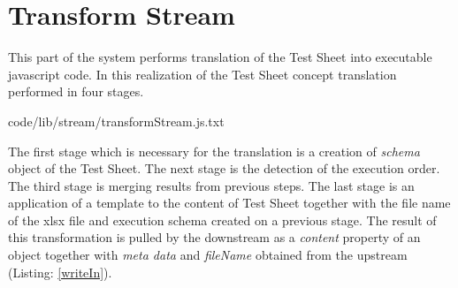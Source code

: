 %
%


\section{Transform Stream}
\label{sec:transform}
This part of the system performs translation of the Test Sheet into executable javascript code. In this realization of the Test Sheet concept translation performed in four stages. 



{code/lib/stream/transformStream.js.txt}

The first stage which is necessary for the translation is a creation of \textit{schema} object of the Test Sheet. The next stage is the detection of the execution order. The third stage is merging results from previous steps. The last stage is an application of a template to the content of Test Sheet together with the file name of the xlsx file and execution schema created on a previous stage. The result of this transformation is pulled by the downstream as a \textit{content} property of an object together with \textit{meta data} and \textit{fileName} obtained from the upstream (Listing: \ref{writeIn}).

